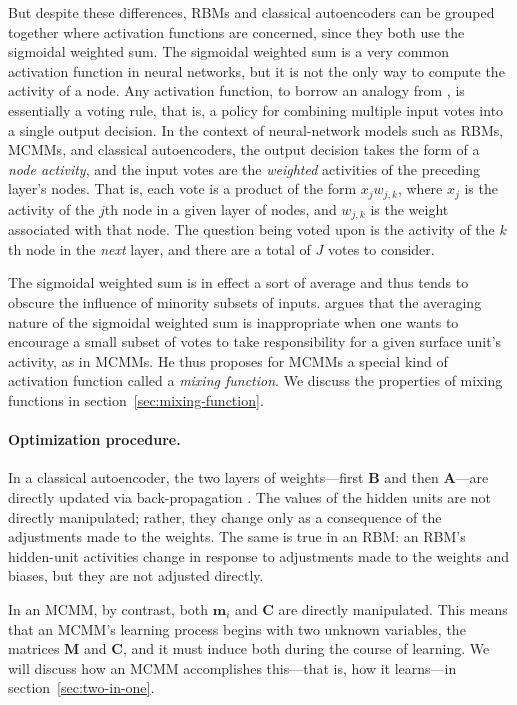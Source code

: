 
But despite these differences, RBMs and classical autoencoders can be grouped together where activation functions are concerned, since they both use the sigmoidal weighted sum.
The sigmoidal weighted sum is a very common activation function in neural networks, 
but it is not the only way to compute the activity of a node. Any activation function, to borrow
an analogy from \citet{saund:94}, is essentially a voting rule, that is,  a policy 
for combining multiple input votes into a single output decision.  
In the context of neural-network models such as RBMs, MCMMs, and 
classical autoencoders, the output decision takes the form of a \emph{node activity},
and the input votes are the \emph{weighted} activities of the preceding layer's nodes. 
That is, each vote is a product of the form $x_{j} w_{j,k}$, where $x_{j}$ is the activity 
of the $j$th node in a given layer of nodes, and $w_{j,k}$ is the weight associated with that 
node. The question being voted upon is the activity of the $k$th node in the 
\emph{next} layer, and there are
a total of $J$ votes to consider.

The sigmoidal weighted sum is in effect a sort of average and thus tends to obscure
the influence of minority subsets of inputs. \citet{saund:94} argues 
that the averaging nature of the sigmoidal weighted sum is inappropriate when one wants to encourage
a small subset of votes to take responsibility for a given surface unit's activity, as in MCMMs.
He thus proposes for MCMMs a special kind of activation function called a \emph{mixing function}.
We discuss the properties of mixing functions in 
section~\ref{sec:mixing-function}.

\paragraph{Optimization procedure.}  In a classical autoencoder, the two layers of 
weights---first $\textbf{B}$ and then $\textbf{A}$---are directly updated via 
back-propagation \citep{rumelhart-et-al:1985, hinton:1987, hinton:1987trans, bourlard:1988}.
The values of the hidden units are not directly manipulated; rather, they change  
only as a 
consequence of the adjustments made to the weights. The same is true in an RBM: 
an RBM's hidden-unit activities change in response to adjustments 
made to the weights and biases, but they are not
adjusted directly.

In an MCMM, by contrast, both $\textbf{m}_i$ and $\textbf{C}$ are directly manipulated. This means that
an MCMM's learning process begins with two unknown variables, the matrices $\textbf{M}$ and 
$\textbf{C}$, and it must induce both during the course of learning. We will discuss how an MCMM accomplishes this---that is, how it learns---in section~\ref{sec:two-in-one}.

